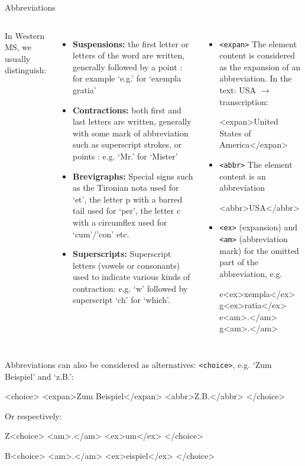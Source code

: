 \begin{frame}{Abbreviations}
\small 

\begin{columns}
In Western MS, we usually distinguish:
\begin{itemize}\scriptsize
\item  \textbf{Suspensions:} the first letter or letters of the word are written, generally followed by a point : for example ‘e.g.’ for ‘exempla gratia’
\item  \textbf{Contractions:} both first and last letters are written, generally with some mark of abbreviation such as superscript strokes, or points : e.g. ‘Mr.’ for ‘Mister’
\item  \textbf{Brevigraphs:} Special signs such as the Tironian nota used for ‘et’, the letter p with a barred tail used for ‘per’, the letter c with a circumflex used for ‘cum’/’con’ etc.
\item  \textbf{Superscripts:} Superscript letters (vowels or consonants) used to indicate various kinds of contraction: e.g. ‘w’ followed by superscript ‘ch’ for ‘which’.
\end{itemize}

\begin{itemize}\small 
\item  \texttt{<expan>} The element content is considered as the expansion of an abbreviation. In the text: USA $\to$ transcription: 
\begin{xmlcode}
<expan>United States of America</expan>
\end{xmlcode}
\item  \texttt{<abbr>} The element content is an abbreviation
\begin{xmlcode}
<abbr>USA</abbr>
\end{xmlcode}
\item  \texttt{<ex>} (expansion) and \texttt{<am>} (abbreviation mark) for the  omitted part of the abbreviation, e.g.
\begin{xmlcode}
e<ex>xempla</ex> g<ex>ratia</ex>
e<am>.</am> g<am>.</am>
\end{xmlcode}
\end{itemize}
\end{columns}

\framebreak

Abbreviations can also be considered as alternatives: \texttt{<choice>}, e.g. `Zum Beispiel' and `z.B.':
\begin{xmlcode}
<choice>
 <expan>Zum Beispiel</expan>
 <abbr>Z.B.</abbr>
</choice>
\end{xmlcode}

Or respectively:
 \begin{xmlcode}
Z<choice>
   <am>.</am>
   <ex>um</ex>
  </choice>
  
B<choice>
   <am>.</am>
   <ex>eispiel</ex>
 </choice>
\end{xmlcode}


\end{frame}

